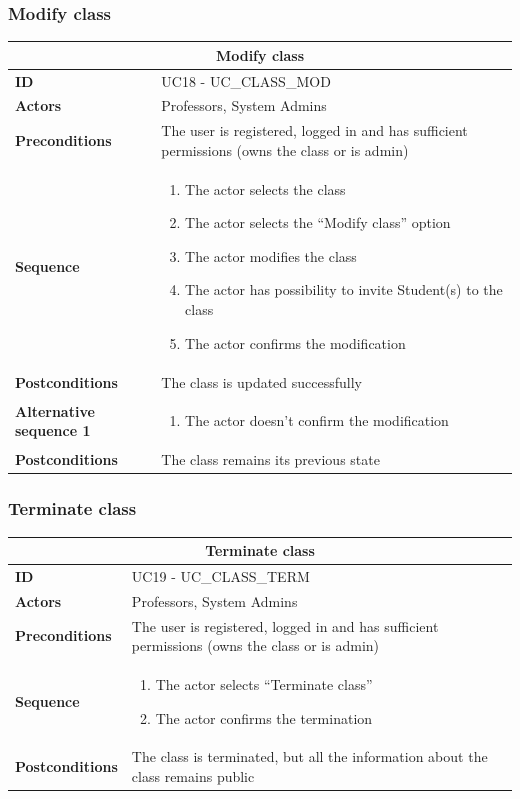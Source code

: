\subsubsection{Modify class}
\begin{tabular}{|m{2.5cm}|m{8cm}|}
	\hline
	\multicolumn{2}{|c|}{Modify class} \\
	\hline
	\textbf{ID} & UC18 - UC\_CLASS\_MOD \\
	\hline
	\textbf{Actors} & Professors, System Admins \\
	\hline
	\textbf{Preconditions} & The user is registered, logged in and has sufficient permissions (owns the class or is admin) \\
	\hline
	\textbf{Sequence} & 
	\begin{enumerate}
		\item The actor selects the class
		\item The actor selects the “Modify class” option
		\item The actor modifies the class
		\item The actor has possibility to invite Student(s) to the class
		\item The actor confirms the modification
	\end{enumerate} \\
	\hline
	\textbf{Postconditions} & The class is updated successfully \\
	\hline
	
	\textbf{Alternative sequence 1} & 
	\begin{enumerate}
		\item The actor doesn’t confirm the modification
	\end{enumerate} \\
	\hline
	\textbf{Postconditions} & The class remains its previous state \\
	\hline
\end{tabular}

\subsubsection{Terminate class}
\begin{tabular}{|m{2.5cm}|m{8cm}|}
	\hline
	\multicolumn{2}{|c|}{Terminate class} \\
	\hline
	\textbf{ID} & UC19 - UC\_CLASS\_TERM \\
	\hline
	\textbf{Actors} & Professors, System Admins \\
	\hline
	\textbf{Preconditions} & The user is registered, logged in and has sufficient permissions (owns the class or is admin) \\
	\hline
	\textbf{Sequence} & 
	\begin{enumerate}
		\item The actor selects “Terminate class”
		\item The actor confirms the termination
	\end{enumerate} \\
	\hline
	\textbf{Postconditions} & The class is terminated, but all the information about the class remains public \\
	\hline
\end{tabular}

